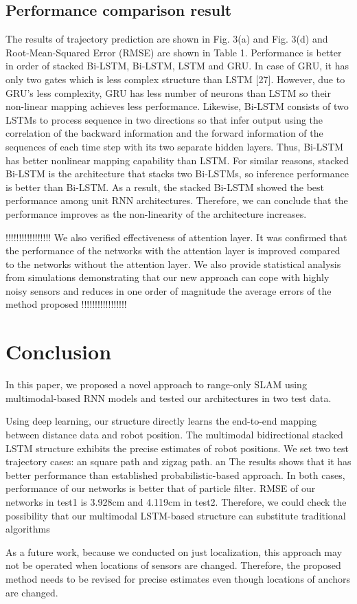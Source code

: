 \documentclass[letterpaper, 10 pt, conference]{ieeeconf}  %
\begin{document}
\subsection{Performance comparison result}

The results of trajectory prediction are shown in Fig. 3(a) and Fig. 3(d) and
Root-Mean-Squared Error (RMSE) are shown in Table 1. Performance is better
in order of stacked Bi-LSTM, Bi-LSTM, LSTM and GRU. In case of GRU, it
has only two gates which is less complex structure than LSTM [27]. However,
due to GRU's less complexity, GRU has less number of neurons than LSTM so
their non-linear mapping achieves less performance. Likewise, Bi-LSTM consists
of two LSTMs to process sequence in two directions so that infer output using
the correlation of the backward information and the forward information of the
sequences of each time step with its two separate hidden layers. Thus, Bi-LSTM
has better nonlinear mapping capability than LSTM. For similar reasons, stacked
Bi-LSTM is the architecture that stacks two Bi-LSTMs, so inference performance
is better than Bi-LSTM. As a result, the stacked Bi-LSTM showed the best
performance among unit RNN architectures. Therefore, we can conclude that
the performance improves as the non-linearity of the architecture increases.


!!!!!!!!!!!!!!!!!
We also verified effectiveness of attention layer. It was confirmed that the performance of the networks with the attention layer is improved compared to the networks without the attention layer.
We also provide statistical analysis from simulations demonstrating that
our new approach can cope with highly noisy sensors and
reduces in one order of magnitude the average errors of the
method proposed
!!!!!!!!!!!!!!!!!


\section{Conclusion}

In this paper, we proposed a novel approach to range-only SLAM using multimodal-based RNN models and tested our architectures in two test data.

Using deep learning, our structure directly learns the end-to-end mapping between distance data and robot position. The multimodal bidirectional stacked LSTM structure exhibits the precise estimates of robot positions. We set two test trajectory cases: an square path and zigzag path. an The results shows that it has better performance than established probabilistic-based approach. In both cases, performance of our networks  is better that of particle filter. RMSE of our networks in test1 is 3.928cm and 4.119cm in test2. Therefore, we could check the possibility that our multimodal LSTM-based structure can substitute traditional algorithms

As a future work, because we conducted on just localization, this approach may not be operated when locations of sensors are changed. Therefore, the proposed method needs to be revised for precise estimates even though locations of anchors are changed. 


\end{document}
